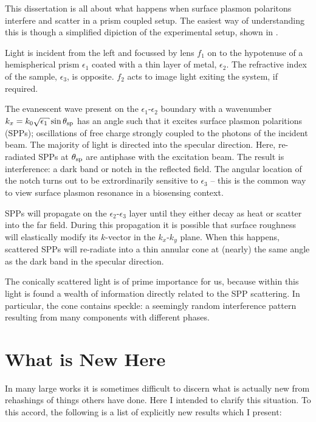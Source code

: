 This dissertation is all about what happens when surface plasmon polaritons
interfere and scatter in a prism coupled setup.  The easiest way of
understanding this is though a simplified dipiction of the experimental
setup, shown in .  

%
Light is incident from the left and focussed by lens $f_1$ on to the
hypotenuse of a hemispherical prism $\epsilon_1$ coated with a thin layer
of metal, $\epsilon_2$.  The refractive index of
the sample, $\epsilon_3$, is opposite.  $f_2$ acts to image light exiting
the system, if required.

The evanescent wave present on the $\epsilon_1$-$\epsilon_2$ boundary with
a wavenumber $k_x = k_0\sqrt{\epsilon_1}\sin \thetasp$ has an angle such
that it excites surface plasmon polaritions (SPPs); oscillations of free
charge strongly coupled to the photons of the incident beam.  The majority
of light is directed into the specular direction.  Here, re-radiated SPPs
at $\theta_\mathrm{sp}$ are antiphase with the excitation beam.  The result is
interference: a dark band or notch in the reflected field.  The angular
location of the notch turns out to be extrordinarily sensitive to
$\epsilon_3$ -- this is the common way to view surface plasmon resonance in
a biosensing context.  

SPPs will propagate on the $\epsilon_2$-$\epsilon_3$ layer until
they either decay as heat or scatter into the far field.  During this
propagation it is possible that surface roughness will elastically modify
its $k$-vector in the $k_x$-$k_y$ plane.  When this happens, scattered SPPs
will re-radiate into a thin annular cone at (nearly) the same angle as the
dark band in the specular direction.

The conically scattered light is of prime importance for us, because within
this light is found a wealth of information directly related to the SPP
scattering.  In particular, the cone contains speckle: a seemingly random
interference pattern resulting from many components with different phases.

\section{What is New Here}
In many large works it is sometimes difficult to discern what is actually
new from rehashings of things others have done.  Here I intended to clarify
this situation.  To this accord, the following is a list of explicitly new
results which I present:

